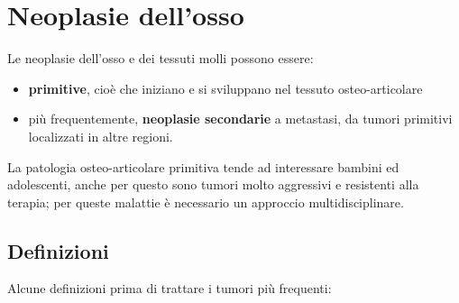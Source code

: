 \section{Neoplasie dell'osso}

Le neoplasie dell'osso e dei tessuti molli possono essere:

\begin{itemize}
\item
  \textbf{primitive}, cioè che iniziano e si sviluppano nel tessuto osteo-articolare
\item
  più frequentemente, \textbf{neoplasie secondarie} a metastasi, da tumori primitivi localizzati in altre regioni.
\end{itemize}

La patologia osteo-articolare primitiva tende ad interessare bambini ed adolescenti, anche per questo sono tumori molto aggressivi e resistenti alla terapia; per queste malattie è necessario un approccio multidisciplinare.

\subsection{Definizioni}

Alcune definizioni prima di trattare i tumori più frequenti:

